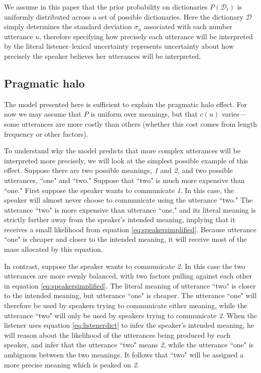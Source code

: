 \documentclass{article} %
\newcommand{\dictionary}{\ensuremath{\mathcal{D}}\xspace}
\begin{document}
We assume in this paper that the prior probability on dictionaries $P(\dictionary_i)$ is uniformly distributed across a set of possible dictionaries. 
Here the dictionary $\dictionary$ simply determines the standard deviation $\sigma_u$ associated with each number utterance $u$, therefore specifying how precisely each utterance will be interpreted by the literal listener--lexical uncertainty represents uncertainty about how precisely the speaker believes her utterances will be interpreted. 


\subsection{Pragmatic halo}

The model presented here is sufficient to explain the pragmatic halo effect. For now we may assume that $P$ is uniform over meanings, but that $c(u)$ varies---some utterances are more costly than others (whether this cost comes from length frequency or other factors).

To understand why the model predicts that more complex utterances will be interpreted more precisely, we will look at the simplest possible example of this effect. Suppose there are two possible meanings, \emph{1} and \emph{2}, and two possible utterances, ``one" and ``two." Suppose that ``two" is much more expensive than ``one." First suppose the speaker wants to communicate \emph{1}. In this case, the speaker will almost never choose to communicate using the utterance ``two." The utterance ``two" is more expensive than utterance ``one," and its literal meaning is strictly farther away from the speaker's intended meaning, implying that it receives a small likelihood from equation \ref{eq:speakersimplified}. Because utterance ``one" is cheaper and closer to the intended meaning, it will receive most of the mass allocated by this equation.

In contrast, suppose the speaker wants to communicate \emph{2}. In this case the two utterances are more evenly balanced, with two factors pulling against each other in equation \ref{eq:speakersimplified}. The literal meaning of utterance ``two" is closer to the intended meaning, but utterance ``one" is cheaper. The utterance ``one" will therefore be used by speakers trying to communicate either meaning, while the utterance ``two" will only be used by speakers trying to communicate \emph{2}. When the listener uses equation \ref{eq:listenerdict} to infer the speaker's intended meaning, he will reason about the likelihood of the utterances being produced by each speaker, and infer that the utterance ``two" means \emph{2}, while the utterance ``one"  is ambiguous between the two meanings. It follows that ``two" will be assigned a more precise meaning which is peaked on \emph{2}. 
\end{document}

